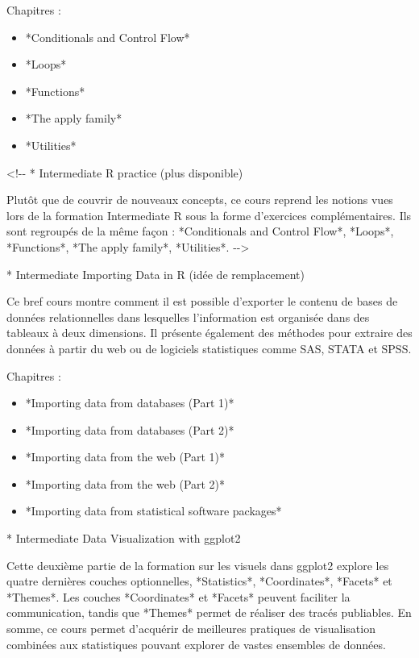 \documentclass[
  letterpaper,
]{scrbook}
\begin{document}
Chapitres :

\begin{itemize}
\item
  *Conditionals and Control Flow*
\item
  *Loops*
\item
  *Functions*
\item
  *The apply family*
\item
  *Utilities*
\end{itemize}

\textless!-\/- * Intermediate R practice (plus disponible)

Plutôt que de couvrir de nouveaux concepts, ce cours reprend les notions
vues lors de la formation Intermediate R sous la forme d'exercices
complémentaires. Ils sont regroupés de la même façon : *Conditionals and
Control Flow*, *Loops*, *Functions*, *The apply family*, *Utilities*.
-\/-\textgreater{}

* Intermediate Importing Data in R (idée de remplacement)

Ce bref cours montre comment il est possible d'exporter le contenu de
bases de données relationnelles dans lesquelles l'information est
organisée dans des tableaux à deux dimensions. Il présente également des
méthodes pour extraire des données à partir du web ou de logiciels
statistiques comme SAS, STATA et SPSS.

Chapitres :

\begin{itemize}
\item
  *Importing data from databases (Part 1)*
\item
  *Importing data from databases (Part 2)*
\item
  *Importing data from the web (Part 1)*
\item
  *Importing data from the web (Part 2)*
\item
  *Importing data from statistical software packages*
\end{itemize}

* Intermediate Data Visualization with ggplot2

Cette deuxième partie de la formation sur les visuels dans ggplot2
explore les quatre dernières couches optionnelles, *Statistics*,
*Coordinates*, *Facets* et *Themes*. Les couches *Coordinates* et
*Facets* peuvent faciliter la communication, tandis que *Themes* permet
de réaliser des tracés publiables. En somme, ce cours permet d'acquérir
de meilleures pratiques de visualisation combinées aux statistiques
pouvant explorer de vastes ensembles de données.
\end{document}
